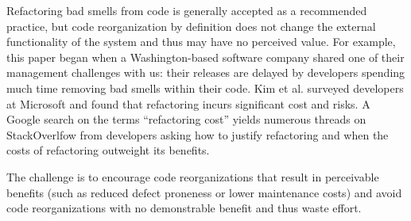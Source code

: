 \documentclass[twocolumn,5p]{elsarticle}
\theoremstyle{break}
\begin{document}
	Refactoring bad smells from code is generally accepted as a recommended practice, but code reorganization by definition does not change the external functionality of the system and thus may have no perceived value. For example, this paper began when a Washington-based software company shared one of their management challenges with us: their  releases are delayed by developers spending  much time removing bad smells within their code. 
	Kim et al.\cite{kim2012field} surveyed developers at Microsoft and found that refactoring incurs significant cost and risks. A Google search on the terms ``refactoring cost'' yields numerous threads on StackOverlfow from developers asking how to justify refactoring and when the costs of refactoring outweight its benefits. 
	
	
	
	
	The challenge is to encourage code reorganizations that result in perceivable benefits (such as reduced defect proneness or lower maintenance costs) and avoid code reorganizations with no demonstrable benefit and thus waste effort.
	
\end{document}
